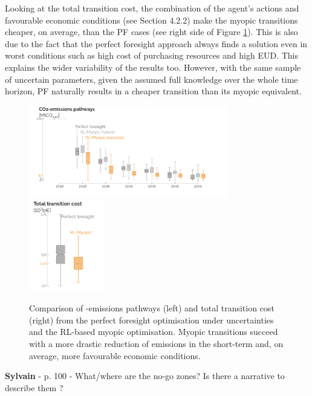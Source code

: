 \documentclass[12pt,a4paper]{article}
\begin{document}
\begin{mdframed}[style=manuscript] %
Looking at the total transition cost, the combination of the agent's actions and favourable economic conditions (see Section 4.2.2) make the myopic transitions cheaper, on average, than the PF cases (see right side of Figure \ref{fig:Gwp_pathway_total_tran_cost}). This is also due to the fact that the perfect foresight approach always finds a solution even in worst conditions such as high cost of purchasing resources and high EUD. This explains the wider variability of the results too. However, with the same sample of uncertain parameters, given the assumed full knowledge over the whole time horizon, PF naturally results in a cheaper transition than its myopic equivalent.
\end{mdframed}

\begin{figure}[!htbp]
\centering
\includegraphics[height=4cm]{Gwp_pathway_core.pdf}
\includegraphics[height=4cm]{Transition_cost_comp_2.pdf}
\caption{Comparison of -emissions pathways (left) and total transition cost (right) from the perfect foresight optimisation under uncertainties and the RL-based myopic optimisation. Myopic transitions succeed with a more drastic reduction of emissions in the short-term and, on average, more favourable economic conditions.}
\label{fig:Gwp_pathway_total_tran_cost}
\end{figure}

\begin{mdframed}[style=comment] %
{\color{purple} \textbf{Sylvain}} - p. 100 - What/where are the no-go zones? Is there a narrative to describe them ?
\end{mdframed}
\end{document}
